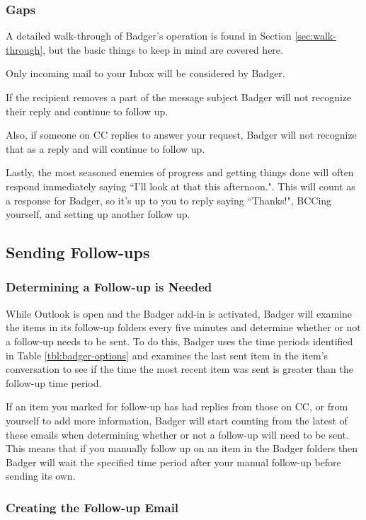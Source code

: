 \documentclass[12pt]{article}
\begin{document}
\subsubsection{Gaps}

A detailed walk-through of Badger's operation is found in Section \ref{sec:walk-through}, but the basic things to keep in mind are covered here. 

Only incoming mail to your Inbox will be considered by Badger.

If the recipient removes a part of the message subject Badger will not recognize their reply and continue to follow up.

Also, if someone on CC replies to answer your request, Badger will not recognize that as a reply and will continue to follow up.

Lastly, the most seasoned enemies of progress and getting things done will often respond immediately saying ``I'll look at that this afternoon.".  This will count as a response for Badger, so it's up to you to reply saying ``Thanks!", BCCing yourself, and setting up another follow up.

\subsection{Sending Follow-ups}

\subsubsection{Determining a Follow-up is Needed}

While Outlook is open and the Badger add-in is activated, Badger will examine the items in its follow-up folders every five minutes and determine whether or not a follow-up needs to be sent. To do this, Badger uses the time periods identified in Table \ref{tbl:badger-options} and examines the last sent item in the item's conversation to see if the time the most recent item was sent is greater than the follow-up time period.

If an item you marked for follow-up has had replies from those on CC, or from yourself to add more information, Badger will start counting from the latest of these emails when determining whether or not a follow-up will need to be sent.  This means that if you manually follow up on an item in the Badger folders then Badger will wait the specified time period after your manual follow-up before sending its own.

\subsubsection{Creating the Follow-up Email}
\end{document}
